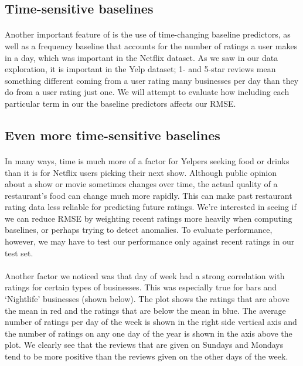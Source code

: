 \documentclass[11pt]{article}
\begin{document}
\subsection*{Time-sensitive baselines}

\paragraph{} Another important feature of \cite{koren} is the use of time-changing baseline predictors, as well as a frequency baseline that accounts for the number of ratings a user makes in a day, which was important in the Netflix dataset. As we saw in our data exploration, it is important in the Yelp dataset; 1- and 5-star reviews mean something different coming from a user rating many businesses per day than they do from a user rating just one. We will attempt to evaluate how including each particular term in our the baseline predictors affects our RMSE.

\subsection*{Even more time-sensitive baselines}

\paragraph{} In many ways, time is much more of a factor for Yelpers seeking food or drinks than it is for Netflix users picking their next show. Although public opinion about a show or movie sometimes changes over time, the actual quality of a restaurant's food can change much more rapidly. This can make past restaurant rating data less reliable for predicting future ratings. We're interested in seeing if we can reduce RMSE by weighting recent ratings more heavily when computing baselines, or perhaps trying to detect anomalies. To evaluate performance, however, we may have to test our performance only against recent ratings in our test set.

\paragraph{} Another factor we noticed was that day of week had a strong correlation with ratings for certain types of businesses. This was especially true for bars and `Nightlife' businesses (shown below). The plot shows the ratings that are above the mean in red and the ratings that are below the mean in blue. The average number of ratings per day of the week is shown in the right side vertical axis and the number of ratings on any one day of the year is shown in the axis above the plot. We clearly see that the reviews that are given on Sundays and Mondays tend to be more positive than the reviews given on the other days of the week.
\end{document}
